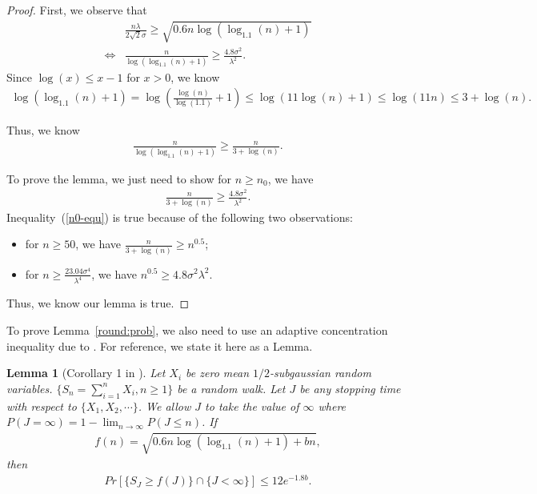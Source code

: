 \documentclass{article}
\newtheorem{lemma}{Lemma}
\begin{document}
\begin{proof}
First, we observe that
\begin{align}
&\frac{n\lambda}{2\sqrt{2}\sigma}\geq \sqrt{0.6n\log(\log_{1.1}(n)+1)} \nonumber \\
\iff &\frac{n}{\log(\log_{1.1}(n)+1)}\geq \frac{4.8\sigma^2}{\lambda^2}. \nonumber 
\end{align}
Since $\log(x)\leq x-1$ for $x>0$, we know 
\begin{align}
\log(\log_{1.1}(n)+1)=\log\left(\frac{\log(n)}{\log(1.1)}+1\right)\leq \log(11\log(n)+1)\leq \log(11n)\leq 3+\log(n). \nonumber
\end{align}

Thus, we know
\begin{align}
\frac{n}{\log(\log_{1.1}(n)+1)}\geq \frac{n}{3+\log(n)}. \nonumber 
\end{align}

To prove the lemma, we just need to show for $n\geq n_{0}$, we have
\begin{align}
\frac{n}{3+\log(n)}\geq \frac{4.8\sigma^2}{\lambda^2}. \label{n0-equ}
\end{align}
Inequality~(\ref{n0-equ}) is true because of the following two observations:
\begin{itemize}
\item for $n\geq 50$, we have $\frac{n}{3+\log(n)}\geq n^{0.5}$;
\item for $n\geq \frac{23.04\sigma^4}{\lambda^4}$, we have $n^{0.5}\geq {4.8\sigma^{2}}{\lambda^{2}}$.
\end{itemize}

Thus, we know our lemma is true.

\end{proof}

To prove Lemma~\ref{round:prob}, we also need to use an adaptive concentration inequality due to \cite{zhao2016adaptive}. For reference, we state it here as a Lemma.

\begin{lemma}[Corollary 1 in \cite{zhao2016adaptive}]
Let $X_{i}$ be zero mean $1/2$-subgaussian random variables. $\{S_{n}=\sum_{i=1}^{n}X_{i},n\geq 1\}$ be a random walk. Let $J$ be any stopping time with respect to $\{X_1,X_2,\cdots\}$. We allow $J$ to take the value of $\infty$ where $P(J=\infty)=1-\lim_{n\rightarrow \infty}P(J\leq n)$. If
\begin{align}
f(n)=\sqrt{0.6n\log(\log_{1.1}(n)+1)+bn}, \nonumber
\end{align}
then
\begin{align}
Pr[\{S_{J}\geq f(J)\}\cap \{J<\infty\}]\leq 12e^{-1.8b}. \nonumber
\end{align}
\label{ACI-inequality}
\end{lemma}
\end{document}
